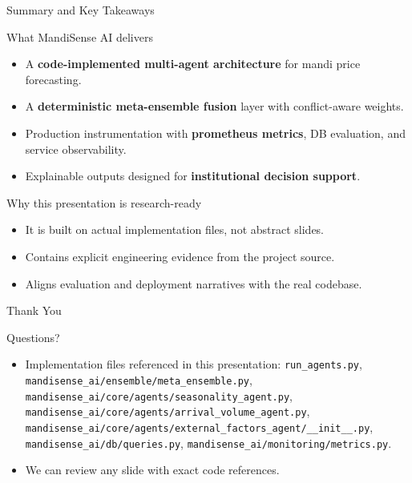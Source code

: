 \documentclass{beamer}
\begin{document}
\begin{frame}{Summary and Key Takeaways}
\begin{successcard}{What MandiSense AI delivers}
  \begin{itemize}
    \item A \textbf{code-implemented multi-agent architecture} for mandi price forecasting.
    \item A \textbf{deterministic meta-ensemble fusion} layer with conflict-aware weights.
    \item Production instrumentation with \textbf{prometheus metrics}, DB evaluation, and service observability.
    \item Explainable outputs designed for \textbf{institutional decision support}.
  \end{itemize}
\end{successcard}

\vspace{6pt}
\begin{alertcard}{Why this presentation is research-ready}
  \begin{itemize}
    \item It is built on actual implementation files, not abstract slides.
    \item Contains explicit engineering evidence from the project source.
    \item Aligns evaluation and deployment narratives with the real codebase.
  \end{itemize}
\end{alertcard}
\end{frame}

\begin{frame}{Thank You}
\begin{infocard}{Questions?}
  \begin{itemize}
    \item Implementation files referenced in this presentation:
      \texttt{run\_agents.py}, \texttt{mandisense\_ai/ensemble/meta\_ensemble.py},
      \texttt{mandisense\_ai/core/agents/seasonality\_agent.py},
      \texttt{mandisense\_ai/core/agents/arrival\_volume\_agent.py},
      \texttt{mandisense\_ai/core/agents/external\_factors\_agent/\_\_init\_\_.py},
      \texttt{mandisense\_ai/db/queries.py},
      \texttt{mandisense\_ai/monitoring/metrics.py}.
    \item We can review any slide with exact code references.
  \end{itemize}
\end{infocard}
\end{frame}
\end{document}
